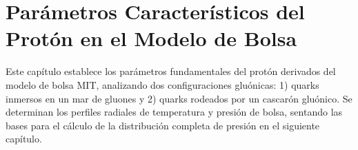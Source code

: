 \chapter{Parámetros Característicos del Protón en el Modelo de Bolsa}\label{ch-ProtonBagParameters}

\fancyhf{} %

\begin{chaptersummary}
    Este capítulo establece los parámetros fundamentales del protón derivados del modelo de bolsa MIT, analizando dos configuraciones gluónicas: 1) quarks inmersos en un mar de gluones y 2) quarks rodeados por un cascarón gluónico. Se determinan los perfiles radiales de temperatura y presión de bolsa, sentando las bases para el cálculo de la distribución completa de presión en el siguiente capítulo.
\end{chaptersummary}


